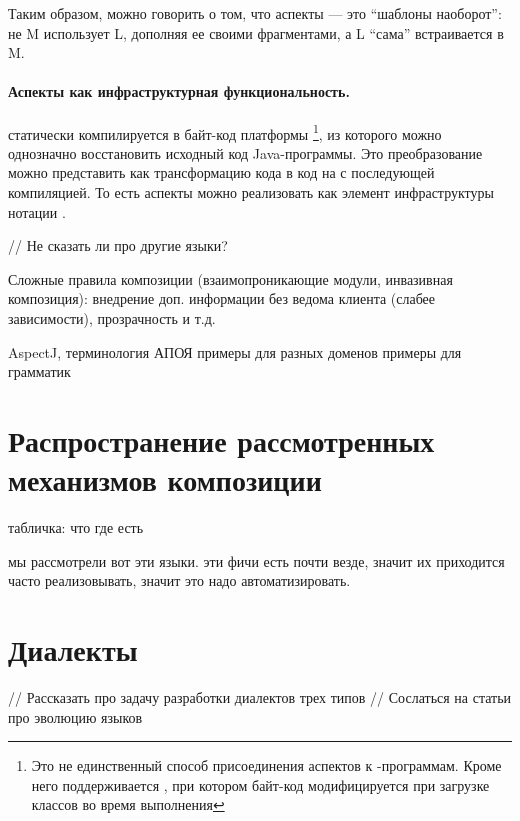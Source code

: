 Таким образом, можно говорить о том, что аспекты --- это ``шаблоны наоборот'': не M использует L, дополняя ее своими фрагментами, а L ``сама'' встраивается в M.

\paragraph*{Аспекты как инфраструктурная функциональность.}  статически компилируется в байт-код платформы \footnote{Это не единственный способ присоединения аспектов к -программам. Кроме него поддерживается , при котором байт-код модифицируется при загрузке классов во время выполнения}, из которого можно однозначно восстановить исходный код Java-программы. Это преобразование можно представить как трансформацию кода  в код на  с последующей компиляцией. То есть аспекты можно реализовать как элемент инфраструктуры нотации .

// Не сказать ли про другие языки?


Сложные правила композиции (взаимопроникающие модули, инвазивная композиция): внедрение доп. информации без ведома клиента (слабее зависимости), прозрачность и т.д.
	
	AspectJ, терминология
	АПОЯ
		примеры для разных доменов
		примеры для грамматик


\section{Распространение рассмотренных механизмов композиции}

табличка: что где есть

мы рассмотрели вот эти языки. эти фичи есть почти везде, значит их приходится часто реализовывать, значит это надо автоматизировать.

\section{Диалекты}

// Рассказать про задачу разработки диалектов трех типов
// Сослаться на статьи про эволюцию языков
